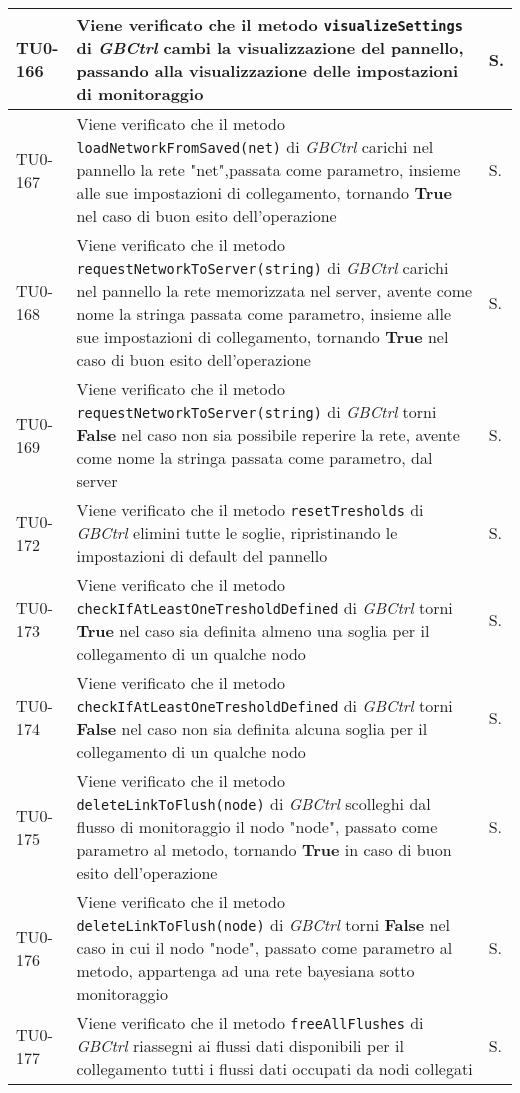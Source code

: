 \begin{longtable}{|C{.15\textwidth}|m{.66\textwidth}|C{.10\textwidth}|}
\hline
TU0-166 & Viene verificato che il metodo \texttt{visualizeSettings} di \textit{GBCtrl} cambi la visualizzazione del pannello, passando alla visualizzazione delle impostazioni di monitoraggio & S.\\
\hline
{}TU0-167 & Viene verificato che il metodo \texttt{loadNetworkFromSaved(net)} di \textit{GBCtrl} carichi nel pannello la rete "net",passata come parametro, insieme alle sue impostazioni di collegamento, tornando \textbf{True} nel caso di buon esito dell'operazione & S.\\
\hline
TU0-168 & Viene verificato che il metodo \texttt{requestNetworkToServer(string)} di \textit{GBCtrl} carichi nel pannello la rete memorizzata nel server, avente come nome la stringa passata come parametro, insieme alle sue impostazioni di collegamento, tornando \textbf{True} nel caso di buon esito dell'operazione & S.\\
\hline
{}TU0-169 & Viene verificato che il metodo \texttt{requestNetworkToServer(string)} di \textit{GBCtrl} torni \textbf{False} nel caso non sia possibile reperire la rete, avente come nome la stringa passata come parametro, dal server & S.\\
\hline
TU0-172 & Viene verificato che il metodo \texttt{resetTresholds} di \textit{GBCtrl} elimini tutte le soglie, ripristinando le impostazioni di default del pannello & S.\\
\hline
{}TU0-173 & Viene verificato che il metodo \texttt{checkIfAtLeastOneTresholdDefined} di \textit{GBCtrl} torni \textbf{True} nel caso sia definita almeno una soglia per il collegamento di un qualche nodo & S.\\
\hline
TU0-174 & Viene verificato che il metodo \texttt{checkIfAtLeastOneTresholdDefined} di \textit{GBCtrl} torni \textbf{False} nel caso non sia definita alcuna soglia per il collegamento di un qualche nodo & S.\\
\hline
{}TU0-175 & Viene verificato che il metodo \texttt{deleteLinkToFlush(node)} di \textit{GBCtrl} scolleghi dal flusso di monitoraggio il nodo "node", passato come parametro al metodo, tornando \textbf{True} in caso di buon esito dell'operazione & S.\\
\hline
TU0-176 & Viene verificato che il metodo \texttt{deleteLinkToFlush(node)} di \textit{GBCtrl} torni \textbf{False} nel caso in cui il nodo "node", passato come parametro al metodo, appartenga ad una rete bayesiana sotto monitoraggio & S.\\
\hline
{}TU0-177 & Viene verificato che il metodo \texttt{freeAllFlushes} di \textit{GBCtrl} riassegni ai flussi dati disponibili per il collegamento tutti i flussi dati occupati da nodi collegati & S.\\

\end{longtable}
